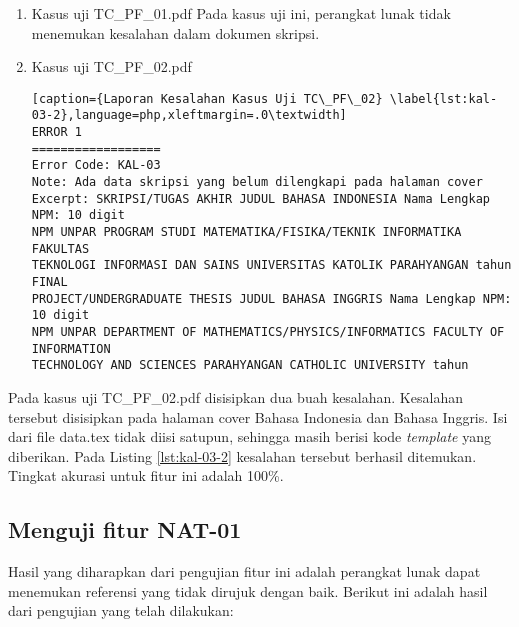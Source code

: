 \begin{enumerate}
	\item Kasus uji TC\_PF\_01.pdf \newline
	Pada kasus uji ini, perangkat lunak tidak menemukan kesalahan dalam dokumen skripsi.
	
	\item Kasus uji TC\_PF\_02.pdf
	
\begin{lstlisting}[caption={Laporan Kesalahan Kasus Uji TC\_PF\_02}	\label{lst:kal-03-2},language=php,xleftmargin=.0\textwidth]
ERROR 1
==================
Error Code: KAL-03
Note: Ada data skripsi yang belum dilengkapi pada halaman cover
Excerpt: SKRIPSI/TUGAS AKHIR JUDUL BAHASA INDONESIA Nama Lengkap NPM: 10 digit 
NPM UNPAR PROGRAM STUDI MATEMATIKA/FISIKA/TEKNIK INFORMATIKA FAKULTAS 
TEKNOLOGI INFORMASI DAN SAINS UNIVERSITAS KATOLIK PARAHYANGAN tahun FINAL 
PROJECT/UNDERGRADUATE THESIS JUDUL BAHASA INGGRIS Nama Lengkap NPM: 10 digit 
NPM UNPAR DEPARTMENT OF MATHEMATICS/PHYSICS/INFORMATICS FACULTY OF INFORMATION 
TECHNOLOGY AND SCIENCES PARAHYANGAN CATHOLIC UNIVERSITY tahun 
\end{lstlisting}
\end{enumerate}

Pada kasus uji TC\_PF\_02.pdf disisipkan dua buah kesalahan. Kesalahan tersebut disisipkan pada halaman cover Bahasa Indonesia dan Bahasa Inggris. Isi dari file data.tex tidak diisi satupun, sehingga masih berisi kode \textit{template} yang diberikan. Pada Listing \ref{lst:kal-03-2} kesalahan tersebut berhasil ditemukan. Tingkat akurasi untuk fitur ini adalah 100\%.

\subsection{Menguji fitur NAT-01}
Hasil yang diharapkan dari pengujian fitur ini adalah perangkat lunak dapat menemukan referensi yang tidak dirujuk dengan baik. Berikut ini adalah hasil dari pengujian yang telah dilakukan:

